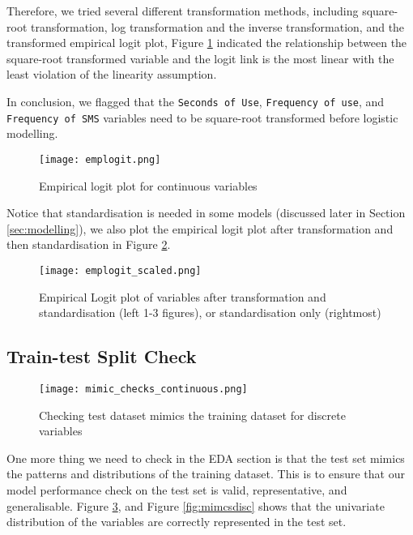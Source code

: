\documentclass[11pt]{article}
\begin{document}
Therefore, we tried several different transformation methods, including square-root transformation, log transformation and the inverse transformation, and the transformed empirical logit plot, Figure \ref{fig:emplogit} indicated the relationship between the square-root transformed variable and the logit link is the most linear with the least violation of the linearity assumption. 

In conclusion, we flagged that the \texttt{Seconds of Use}, \texttt{Frequency of use}, and \texttt{Frequency of SMS} variables need to be square-root transformed before logistic modelling. 

\begin{figure}[H]
    \centering
    \texttt{[image: emplogit.png]}
    \caption{Empirical logit plot for continuous variables}
    \label{fig:emplogit}
\end{figure}

Notice that standardisation is needed in some models (discussed later in Section \ref{sec:modelling}), we also plot the empirical logit plot after transformation and then standardisation in Figure \ref{fig:emplogitscaled}. 

\begin{figure}[h]
    \centering
    \texttt{[image: emplogit\_scaled.png]}
    \caption{Empirical Logit plot of variables after transformation and standardisation (left 1-3 figures), or standardisation only (rightmost)}
    \label{fig:emplogitscaled}
\end{figure}


\subsection{Train-test Split Check}

\begin{figure}[H]
    \centering
    \texttt{[image: mimic\_checks\_continuous.png]}
    \caption{Checking test dataset mimics the training dataset for discrete variables}
    \label{fig:mimicscont}
\end{figure}

One more thing we need to check in the EDA section is that the test set mimics the patterns and distributions of the training dataset. This is to ensure that our model performance check on the test set is valid, representative, and generalisable. Figure \ref{fig:mimicscont}, and Figure \ref{fig:mimcsdisc} shows that the univariate distribution of the variables are correctly represented in the test set. 
\end{document}

